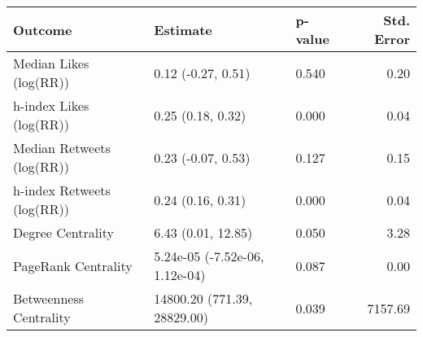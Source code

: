 \begin{table}[ht]
\centering
\begin{tabular}{lllr}
  \hline
Outcome & Estimate & p-value & Std. Error \\ 
  \hline
Median Likes (log(RR)) & 0.12 (-0.27, 0.51) & 0.540 & 0.20 \\ 
  h-index Likes (log(RR)) & 0.25 (0.18, 0.32) & 0.000 & 0.04 \\ 
  Median Retweets (log(RR)) & 0.23 (-0.07, 0.53) & 0.127 & 0.15 \\ 
  h-index Retweets (log(RR)) & 0.24 (0.16, 0.31) & 0.000 & 0.04 \\ 
  Degree Centrality & 6.43 (0.01, 12.85) & 0.050 & 3.28 \\ 
  PageRank Centrality & 5.24e-05 (-7.52e-06, 1.12e-04) & 0.087 & 0.00 \\ 
  Betweenness Centrality & 14800.20 (771.39, 28829.00) & 0.039 & 7157.69 \\ 
   \hline
\end{tabular}
\end{table}
